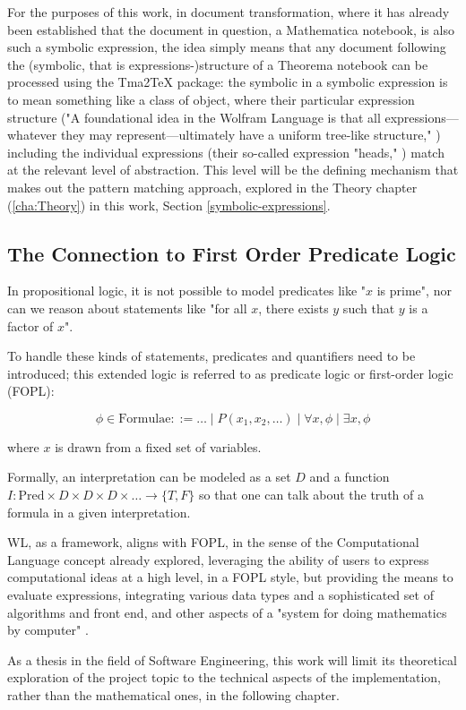 For the purposes of this work, in document transformation, where it has already been established that the document in question, a Mathematica notebook, is also such a symbolic expression, the idea simply means that any document following the (symbolic, that is expressions-)structure of a Theorema notebook can be processed using the Tma2TeX package: the symbolic in a symbolic expression is to mean something like a class of object, where their particular expression structure ("A foundational idea in the Wolfram Language is that all expressions—whatever they may represent—ultimately have a uniform tree-like structure," \cite{noauthor_expression_nodate}) including the individual expressions (their so-called expression "heads," \cite{noauthor_headwolfram_nodate}) match at the relevant level of abstraction. This level will be the defining mechanism that makes out the pattern matching approach, explored in the Theory chapter (\ref{cha:Theory}) in this work, Section \ref{symbolic-expressions}.

\subsection{The Connection to First Order Predicate Logic} \label{computational-language}

In propositional logic, it is not possible to model predicates like "\( x \) is prime", nor can we reason about statements like "for all \( x \), there exists \( y \) such that \( y \) is a factor of \( x \)". \cite{michael_george_first_2024}

To handle these kinds of statements, predicates and quantifiers need to be introduced; this extended logic is referred to as predicate logic or first-order logic (FOPL):

\[
\phi \in \text{Formulae} ::= \dots \mid P(x_1, x_2, \dots) \mid \forall x, \phi \mid \exists x, \phi
\]

where \( x \) is drawn from a fixed set of variables. \cite{michael_george_first_2024}

Formally, an interpretation can be modeled as a set \( D \) and a function \( I : \text{Pred} \times D \times D \times D \times \dots \to \{T, F\} \) so that one can talk about the truth of a formula in a given interpretation. \cite{michael_george_first_2024}

WL, as a framework, aligns with FOPL, in the sense of the Computational Language concept already explored, leveraging the ability of users to express computational ideas at a high level, in a FOPL style, but providing the means to evaluate  expressions, integrating various data types and a sophisticated set of algorithms and front end, and other aspects of a "system for doing mathematics by computer" \cite{wolfram_research_inc_mathematica_2024}.

As a thesis in the field of Software Engineering, this work will limit its theoretical exploration of the project topic to the technical aspects of the implementation, rather than the mathematical ones, in the following chapter.
